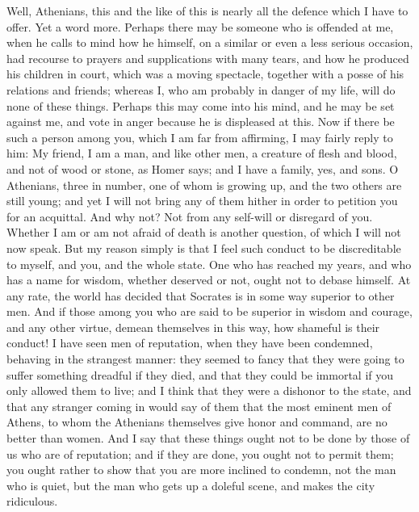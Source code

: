 \documentclass[11pt]{article}
\begin{document}
Well, Athenians, this and the like of this is nearly all the defence which I have to offer. Yet a word more. Perhaps there may be someone who is offended at me, when he calls to mind how he himself, on a similar or even a less serious occasion, had recourse to prayers and supplications with many tears, and how he produced his children in court, which was a moving spectacle, together with a posse of his relations and friends; whereas I, who am probably in danger of my life, will do none of these things. Perhaps this may come into his mind, and he may be set against me, and vote in anger because he is displeased at this. Now if there be such a person among you, which I am far from affirming, I may fairly reply to him: My friend, I am a man, and like other men, a creature of flesh and blood, and not of wood or stone, as Homer says; and I have a family, yes, and sons. O Athenians, three in number, one of whom is growing up, and the two others are still young; and yet I will not bring any of them hither in order to petition you for an acquittal. And why not? Not from any self-will or disregard of you. Whether I am or am not afraid of death is another question, of which I will not now speak. But my reason simply is that I feel such conduct to be discreditable to myself, and you, and the whole state. One who has reached my years, and who has a name for wisdom, whether deserved or not, ought not to debase himself. At any rate, the world has decided that Socrates is in some way superior to other men. And if those among you who are said to be superior in wisdom and courage, and any other virtue, demean themselves in this way, how shameful is their conduct! I have seen men of reputation, when they have been condemned, behaving in the strangest manner: they seemed to fancy that they were going to suffer something dreadful if they died, and that they could be immortal if you only allowed them to live; and I think that they were a dishonor to the state, and that any stranger coming in would say of them that the most eminent men of Athens, to whom the Athenians themselves give honor and command, are no better than women. And I say that these things ought not to be done by those of us who are of reputation; and if they are done, you ought not to permit them; you ought rather to show that you are more inclined to condemn, not the man who is quiet, but the man who gets up a doleful scene, and makes the city ridiculous.
\end{document}

